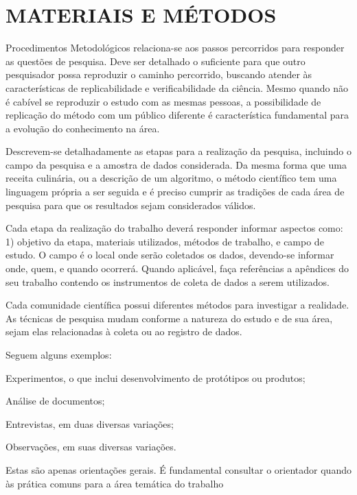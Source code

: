 \chapter{MATERIAIS E MÉTODOS} %
\label{chap:metodologia}

Procedimentos Metodológicos relaciona-se aos passos percorridos para responder as questões de pesquisa. Deve ser detalhado o suficiente para que outro pesquisador possa reproduzir o caminho percorrido, buscando atender às características de replicabilidade e verificabilidade da ciência. Mesmo quando não é cabível se reproduzir o estudo com as mesmas pessoas, a possibilidade de replicação do método com um público diferente é característica fundamental para a evolução do conhecimento na área. 

Descrevem-se detalhadamente as etapas para a realização da pesquisa, incluindo o campo da pesquisa e a amostra de dados considerada.  Da mesma forma que uma receita culinária, ou a descrição de um algoritmo, o método científico tem uma linguagem própria a ser seguida e é preciso cumprir as tradições de cada área de pesquisa para que os resultados sejam considerados válidos.

Cada etapa da realização do trabalho deverá responder informar aspectos como: 1) objetivo da etapa, materiais utilizados, métodos de trabalho, e campo de estudo. O campo é o local onde serão coletados os dados, devendo-se informar onde, quem, e quando ocorrerá. Quando aplicável, faça referências a apêndices do seu trabalho contendo os instrumentos de coleta de dados a serem utilizados.

Cada comunidade científica possui diferentes métodos para investigar a realidade. As técnicas de pesquisa mudam conforme a natureza do estudo e de sua área, sejam elas relacionadas à coleta ou ao registro de dados.

Seguem alguns exemplos:

\begin{alineascomponto}
    	\item Experimentos, o que inclui desenvolvimento de protótipos ou produtos;
        \item Análise de documentos;
        \item Entrevistas, em duas diversas variações;
        \item Observações, em suas diversas variações.    
\end{alineascomponto}

Estas são apenas orientações gerais. É fundamental consultar o orientador quando às prática comuns para a área temática do trabalho

